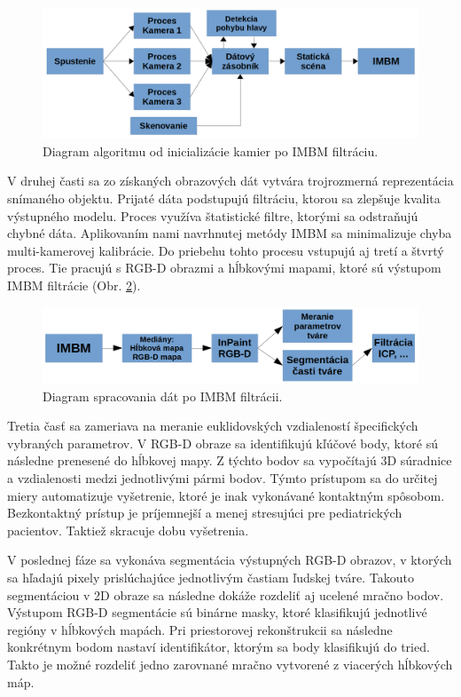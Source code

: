 \begin{figure}[H]
	\centering
	\includegraphics[width=\textwidth]{figures/diagram.png}
	\caption{Diagram algoritmu od inicializácie kamier po IMBM filtráciu.}
	\label{fig:scheme:a}
\end{figure}

V druhej časti sa zo získaných obrazových dát vytvára trojrozmerná reprezentácia snímaného objektu. Prijaté dáta podstupujú filtráciu, ktorou sa zlepšuje kvalita výstupného modelu. Proces využíva štatistické filtre, ktorými sa odstraňujú chybné dáta. Aplikovaním nami navrhnutej metódy IMBM  sa minimalizuje chyba multi-kamerovej kalibrácie. Do priebehu tohto procesu vstupujú aj tretí a štvrtý proces. Tie pracujú s RGB-D obrazmi a hĺbkovými mapami, ktoré sú výstupom IMBM filtrácie (Obr. \ref{fig:scheme:b}). 

\begin{figure}[H]
	\centering
	\includegraphics[width=\textwidth]{figures/diagram_post_imbm.png}
	\caption{Diagram spracovania dát po IMBM filtrácii.}
	\label{fig:scheme:b}
\end{figure}

Tretia časť sa zameriava na meranie euklidovských vzdialeností špecifických vybraných parametrov. V RGB-D obraze sa identifikujú kľúčové body, ktoré sú následne prenesené do hĺbkovej mapy. Z týchto bodov sa vypočítajú 3D súradnice a vzdialenosti medzi jednotlivými pármi bodov. Týmto prístupom sa do určitej miery automatizuje vyšetrenie, ktoré je inak vykonávané kontaktným spôsobom. Bezkontaktný prístup je príjemnejší a menej stresujúci pre pediatrických pacientov. Taktiež skracuje dobu vyšetrenia.\newline 

V poslednej fáze sa vykonáva segmentácia výstupných RGB-D obrazov, v ktorých sa hľadajú pixely prislúchajúce jednotlivým častiam ľudskej tváre. Takouto segmentáciou v 2D obraze sa následne dokáže rozdeliť aj ucelené mračno bodov. Výstupom RGB-D segmentácie sú binárne masky, ktoré klasifikujú jednotlivé regióny v hĺbkových mapách. Pri priestorovej rekonštrukcii sa následne konkrétnym bodom nastaví identifikátor, ktorým sa body klasifikujú do tried. Takto je možné rozdeliť jedno zarovnané mračno vytvorené z viacerých hĺbkových máp. 


